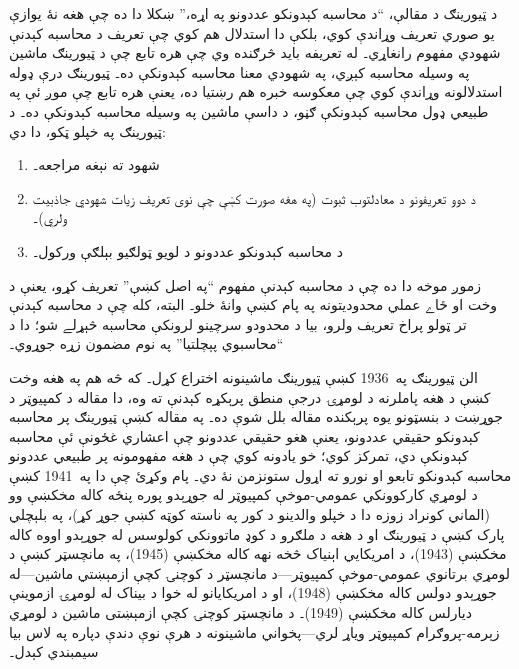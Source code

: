 \documentclass[../../../include/open-logic-section]{subfiles}
\begin{document}
\begin{digress}
د ټيورينګ د مقالې، ``د محاسبه کېدونکو عددونو په اړه،'' ښکلا دا ده چې
هغه نۀ يوازې يو صوري تعريف وړاندې کوي، بلکې دا استدلال هم کوي چې
تعريف د محاسبه کېدنې شهودي مفهوم رانغاړي۔ له تعريفه بايد څرګنده وي
چې هره تابع چې د ټيورينګ ماشين په وسيله محاسبه کېږي، په شهودي معنا
محاسبه کېدونکې ده۔ ټيورينګ درې ډوله استدلالونه وړاندې کوي چې معکوسه
خبره هم رښتيا ده، يعنې هره تابع چې موږ ئې په طبيعي ډول محاسبه کېدونکې
ګڼو، د داسې ماشين په وسيله محاسبه کېدونکې ده۔ د ټيورينګ په خپلو
ټکو، دا دي:
\begin{enumerate}
\item شهود ته نېغه مراجعه۔
\item د دوو تعريفونو د معادلتوب ثبوت (په هغه صورت کښې چې نوی تعريف
  زيات شهودي جاذبيت ولري)۔
\item د محاسبه کېدونکو عددونو د لويو ټولګيو بېلګې ورکول۔
\end{enumerate}
زموږ موخه دا ده چې د محاسبه کېدنې مفهوم ``په اصل کښې'' تعريف کړو،
يعنې د وخت او ځاے عملي محدوديتونه په پام کښې وانۀ خلو۔ البته، کله چې
د محاسبه کېدنې تر ټولو پراخ تعريف ولرو، بيا د محدودو سرچينو لرونکې
محاسبه څېړلے شو؛ دا د ``محاسبوي پېچلتيا'' په نوم مضمون زړه جوړوي۔
\end{digress}

\begin{history}
الن ټيورينګ په~1936 کښې ټيورينګ ماشينونه اختراع کړل۔ که څه هم په هغه
وخت کښې د هغه پاملرنه د لومړۍ درجې منطق پرېکړه کېدنې ته وه، دا مقاله
د کمپيوټر د جوړښت د بنسټونو يوه پرېکنده مقاله بلل شوې ده۔ په مقاله
کښې ټيورينګ پر محاسبه کېدونکو حقيقي عددونو، يعنې هغو حقيقي عددونو چې
اعشاري غځونې ئې محاسبه کېدونکې دي، تمرکز کوي؛ خو يادونه کوي چې د هغه
مفهومونه پر طبيعي عددونو محاسبه کېدونکو تابعو او نورو ته اړول ستونزمن
نۀ دي۔ پام وکړئ چې دا په~1941 کښې د لومړي کارکوونکي عمومي-موخې
کمپيوټر له جوړېدو پوره پنځه کاله مخکښې وو (الماني کونراد زوزه دا د
خپلو والدينو د کور په ناسته کوټه کښې جوړ کړ)، په بلېچلي پارک کښې د
ټيورينګ او د هغه د ملګرو د کوډ ماتوونکي کولوسس له جوړېدو اووه کاله
مخکښې (1943)، د امريکايي اېنياک څخه نهه کاله مخکښې (1945)، په
مانچسټر کښې د لومړي برتانوي عمومي-موخې کمپيوټر---د مانچسټر د کوچنۍ
کچې ازمېښتي ماشين---له جوړېدو دولس کاله مخکښې (1948)، او د
امريکايانو له خوا د بيناک له لومړۍ ازموينې ديارلس کاله مخکښې (1949)۔
د مانچسټر کوچنۍ کچې ازمېښتی ماشين د لومړي زېرمه-پروګرام کمپيوټر وياړ
لري---پخواني ماشينونه د هرې نوې دندې دپاره په لاس بيا سيمبندي کېدل۔
\end{history}
\end{document}
